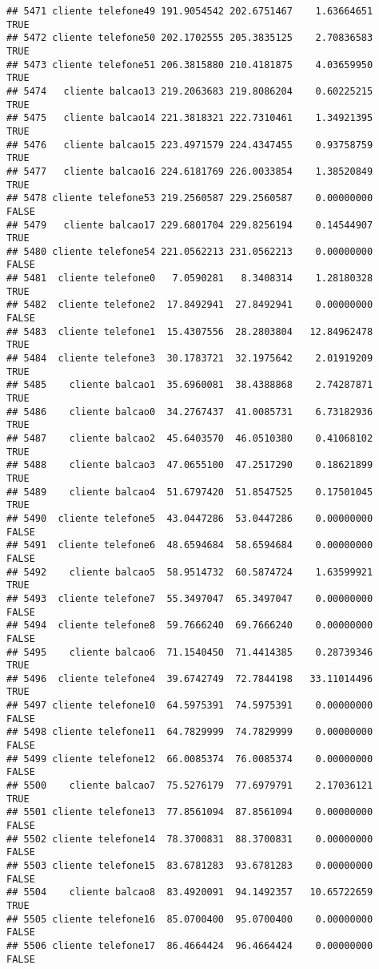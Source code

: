 \documentclass[
]{article}
\begin{document}
\begin{verbatim}
## 5471 cliente telefone49 191.9054542 202.6751467    1.63664651     TRUE
## 5472 cliente telefone50 202.1702555 205.3835125    2.70836583     TRUE
## 5473 cliente telefone51 206.3815880 210.4181875    4.03659950     TRUE
## 5474   cliente balcao13 219.2063683 219.8086204    0.60225215     TRUE
## 5475   cliente balcao14 221.3818321 222.7310461    1.34921395     TRUE
## 5476   cliente balcao15 223.4971579 224.4347455    0.93758759     TRUE
## 5477   cliente balcao16 224.6181769 226.0033854    1.38520849     TRUE
## 5478 cliente telefone53 219.2560587 229.2560587    0.00000000    FALSE
## 5479   cliente balcao17 229.6801704 229.8256194    0.14544907     TRUE
## 5480 cliente telefone54 221.0562213 231.0562213    0.00000000    FALSE
## 5481  cliente telefone0   7.0590281   8.3408314    1.28180328     TRUE
## 5482  cliente telefone2  17.8492941  27.8492941    0.00000000    FALSE
## 5483  cliente telefone1  15.4307556  28.2803804   12.84962478     TRUE
## 5484  cliente telefone3  30.1783721  32.1975642    2.01919209     TRUE
## 5485    cliente balcao1  35.6960081  38.4388868    2.74287871     TRUE
## 5486    cliente balcao0  34.2767437  41.0085731    6.73182936     TRUE
## 5487    cliente balcao2  45.6403570  46.0510380    0.41068102     TRUE
## 5488    cliente balcao3  47.0655100  47.2517290    0.18621899     TRUE
## 5489    cliente balcao4  51.6797420  51.8547525    0.17501045     TRUE
## 5490  cliente telefone5  43.0447286  53.0447286    0.00000000    FALSE
## 5491  cliente telefone6  48.6594684  58.6594684    0.00000000    FALSE
## 5492    cliente balcao5  58.9514732  60.5874724    1.63599921     TRUE
## 5493  cliente telefone7  55.3497047  65.3497047    0.00000000    FALSE
## 5494  cliente telefone8  59.7666240  69.7666240    0.00000000    FALSE
## 5495    cliente balcao6  71.1540450  71.4414385    0.28739346     TRUE
## 5496  cliente telefone4  39.6742749  72.7844198   33.11014496     TRUE
## 5497 cliente telefone10  64.5975391  74.5975391    0.00000000    FALSE
## 5498 cliente telefone11  64.7829999  74.7829999    0.00000000    FALSE
## 5499 cliente telefone12  66.0085374  76.0085374    0.00000000    FALSE
## 5500    cliente balcao7  75.5276179  77.6979791    2.17036121     TRUE
## 5501 cliente telefone13  77.8561094  87.8561094    0.00000000    FALSE
## 5502 cliente telefone14  78.3700831  88.3700831    0.00000000    FALSE
## 5503 cliente telefone15  83.6781283  93.6781283    0.00000000    FALSE
## 5504    cliente balcao8  83.4920091  94.1492357   10.65722659     TRUE
## 5505 cliente telefone16  85.0700400  95.0700400    0.00000000    FALSE
## 5506 cliente telefone17  86.4664424  96.4664424    0.00000000    FALSE

\end{verbatim}
\end{document}
